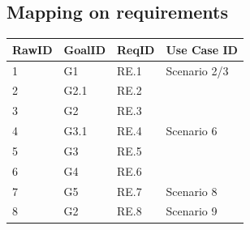 \subsection{Mapping on requirements}
\begin{center}
	\begin{tabular}{ | l | p{2cm} | p{2cm}| p{2cm}|} 
		\hline
		 RawID & GoalID & ReqID & Use Case ID \\
		\hline
		1&G1&RE.1&Scenario 2/3\\
		\hline
		2&G2.1&RE.2&\\
		\hline
		3&G2&RE.3&\\
		\hline
		4&G3.1&RE.4&Scenario 6\\
		\hline
		5&G3&RE.5&\\
		\hline
		6&G4&RE.6&\\
		\hline
		7&G5&RE.7&Scenario 8\\
		\hline
		8&G2&RE.8&Scenario 9\\
		\hline
	\end{tabular}
\end{center}


 
